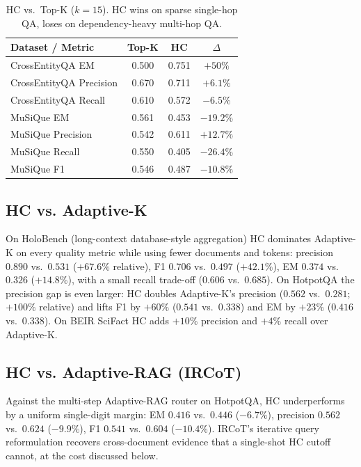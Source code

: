 \documentclass[letterpaper]{article}
\newcommand{\CEqaEMHC}{0.751}
\newcommand{\CEqaEMTopK}{0.500}
\newcommand{\CEqaPrecHC}{0.711}
\newcommand{\CEqaPrecTopK}{0.670}
\newcommand{\CEqaRecHC}{0.572}
\newcommand{\CEqaRecTopK}{0.610}
\newcommand{\MusEMHC}{0.453}
\newcommand{\MusEMTopK}{0.561}
\newcommand{\MusPrecHC}{0.611}
\newcommand{\MusPrecTopK}{0.542}
\newcommand{\MusRecHC}{0.405}
\newcommand{\MusRecTopK}{0.550}
\newcommand{\MusFOneHC}{0.487}
\newcommand{\MusFOneTopK}{0.546}
\newcommand{\HotEMHC}{0.416}
\newcommand{\HotEMIRCoT}{0.446}
\newcommand{\HotEMAdaK}{0.338}
\newcommand{\HotPrecHC}{0.562}
\newcommand{\HotPrecIRCoT}{0.624}
\newcommand{\HotPrecAdaK}{0.281}
\newcommand{\HotFOneHC}{0.541}
\newcommand{\HotFOneIRCoT}{0.604}
\newcommand{\HotFOneAdaK}{0.338}
\newcommand{\HolEMHC}{0.374}
\newcommand{\HolEMAdaK}{0.326}
\newcommand{\HolPrecHC}{0.890}
\newcommand{\HolPrecAdaK}{0.531}
\newcommand{\HolRecHC}{0.606}
\newcommand{\HolRecAdaK}{0.685}
\newcommand{\HolFOneHC}{0.706}
\newcommand{\HolFOneAdaK}{0.497}
\begin{document}
\begin{table}[t]
\centering
\small
\begin{tabular}{lccc}
\hline
Dataset / Metric & Top-K & HC & $\Delta$ \\
\hline
CrossEntityQA EM        & \CEqaEMTopK   & \CEqaEMHC   & $+50\%$ \\
CrossEntityQA Precision & \CEqaPrecTopK & \CEqaPrecHC & $+6.1\%$ \\
CrossEntityQA Recall    & \CEqaRecTopK  & \CEqaRecHC  & $-6.5\%$ \\
\hline
MuSiQue EM              & \MusEMTopK    & \MusEMHC    & $-19.2\%$ \\
MuSiQue Precision       & \MusPrecTopK  & \MusPrecHC  & $+12.7\%$ \\
MuSiQue Recall          & \MusRecTopK   & \MusRecHC   & $-26.4\%$ \\
MuSiQue F1              & \MusFOneTopK  & \MusFOneHC  & $-10.8\%$ \\
\hline
\end{tabular}
\caption{HC vs.\ Top-K ($k=15$). HC wins on sparse single-hop QA,
loses on dependency-heavy multi-hop QA.}
\label{tab:topk}
\end{table}

\subsection{HC vs. Adaptive-K}
\label{sec:adak}
On HoloBench (long-context database-style aggregation) HC dominates
Adaptive-K on every quality metric while using fewer documents and
tokens: precision $\HolPrecHC$ vs.\ $\HolPrecAdaK$ ($+67.6\%$
relative), F1 $\HolFOneHC$ vs.\ $\HolFOneAdaK$ ($+42.1\%$), EM
$\HolEMHC$ vs.\ $\HolEMAdaK$ ($+14.8\%$), with a small recall
trade-off ($\HolRecHC$ vs.\ $\HolRecAdaK$). On HotpotQA the precision
gap is even larger: HC doubles Adaptive-K's precision ($\HotPrecHC$
vs.\ $\HotPrecAdaK$; $+100\%$ relative) and lifts F1 by $+60\%$
($\HotFOneHC$ vs.\ $\HotFOneAdaK$) and EM by $+23\%$ ($\HotEMHC$
vs.\ $\HotEMAdaK$). On BEIR SciFact HC adds $+10\%$ precision and
$+4\%$ recall over Adaptive-K.

\subsection{HC vs. Adaptive-RAG (IRCoT)}
Against the multi-step Adaptive-RAG router on HotpotQA, HC
underperforms by a uniform single-digit margin: EM $\HotEMHC$ vs.\
$\HotEMIRCoT$ ($-6.7\%$), precision $\HotPrecHC$ vs.\
$\HotPrecIRCoT$ ($-9.9\%$), F1 $\HotFOneHC$ vs.\ $\HotFOneIRCoT$
($-10.4\%$). IRCoT's iterative query reformulation recovers
cross-document evidence that a single-shot HC cutoff cannot, at the
cost discussed below.
\end{document}
